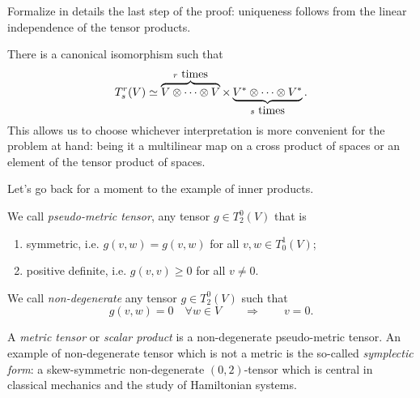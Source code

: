 \begin{exercise}
Formalize in details the last step of the proof: uniqueness follows from the linear independence of the tensor products.
\end{exercise}

\begin{remark}
  There is a canonical isomorphism such that
  \begin{equation}
    T^r_s(V) \simeq \LaTeXoverbrace{V\otimes \cdots \otimes V}^{r\mbox{ times}} \times \LaTeXunderbrace{V^*\otimes \cdots \otimes V^*}_{s\mbox{ times}}.
  \end{equation}
  This allows us to choose whichever interpretation is more convenient for the problem at hand: being it a multilinear map on a cross product of spaces or an element of the tensor product of spaces.
\end{remark}


Let's go back for a moment to the example of inner products.

\begin{definition}
  We call \emph{pseudo-metric tensor}, any tensor $g\in T_2^0(V)$ that is
  \begin{enumerate}
    \item symmetric, i.e. $g(v,w) = g(v,w)$ for all $v,w\in T_0^1(V)$;
    \item positive definite, i.e. $g(v,v)\geq0$ for all $v\neq 0$.
  \end{enumerate}
  
  We call \emph{non-degenerate} any tensor $g\in T_2^0(V)$ such that
  \begin{equation}
    g(v,w) = 0 \quad\forall w\in V \qquad\Longrightarrow\qquad v=0.
  \end{equation}
  
  A \emph{metric tensor} or \emph{scalar product} is a non-degenerate pseudo-metric tensor.
  An example of non-degenerate tensor which is not a metric is the so-called \emph{symplectic form}: a skew-symmetric non-degenerate $(0,2)$-tensor which is central in classical mechanics and the study of Hamiltonian systems.
\end{definition}


